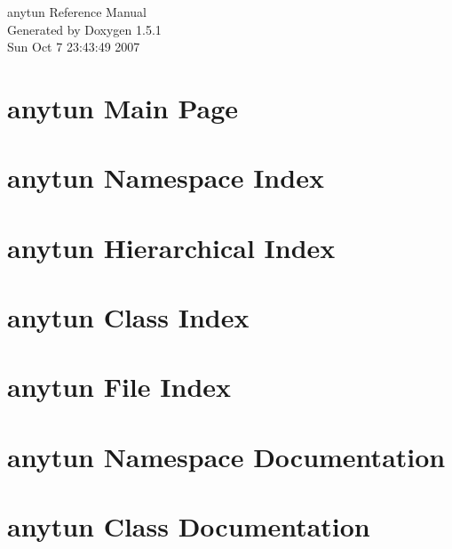 \documentclass[a4paper]{book}
\begin{document}
\begin{titlepage}
\vspace*{7cm}
\begin{center}
{\Large anytun Reference Manual}\\
\vspace*{1cm}
{\large Generated by Doxygen 1.5.1}\\
\vspace*{0.5cm}
{\small Sun Oct 7 23:43:49 2007}\\
\end{center}
\end{titlepage}
\clearemptydoublepage
{}
\tableofcontents
\clearemptydoublepage
{}
\chapter{anytun Main Page}
\label{index}
\chapter{anytun Namespace Index}

\chapter{anytun Hierarchical Index}

\chapter{anytun Class Index}

\chapter{anytun File Index}

\chapter{anytun Namespace Documentation}



\chapter{anytun Class Documentation}






































\end{document}
